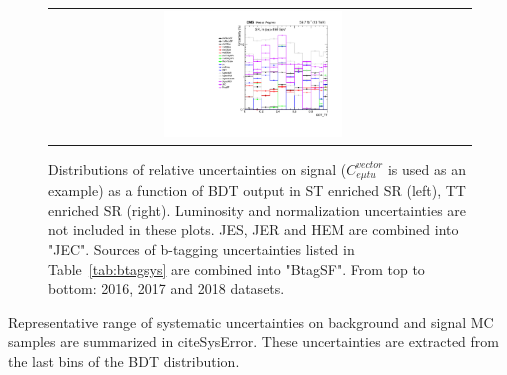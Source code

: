 \begin{figure}[tbh!]
\begin{center}
\begin{tabular}{cc}
  \includegraphics[width=0.45\textwidth]{figures/Part3/Systematics/sysBDT_TT_sig_2018} \\
 \end{tabular}
 \caption{Distributions of relative uncertainties on signal ($C_{e\mu tu}^{vector}$ is used as an example) as a function of BDT output in ST enriched SR (left), TT enriched SR (right). Luminosity and normalization uncertainties are not included in these plots. JES, JER and HEM are combined into "JEC". Sources of b-tagging uncertainties listed in Table~\ref{tab:btagsys} are combined into "BtagSF". From top to bottom: 2016, 2017 and 2018 datasets.}
 \label{fig:Comp_sys_signal}
 \end{center}
\end{figure}

Representative range of systematic uncertainties on background and signal MC samples are summarized in cite{SysError}. These uncertainties are extracted from the last bins of the BDT distribution.